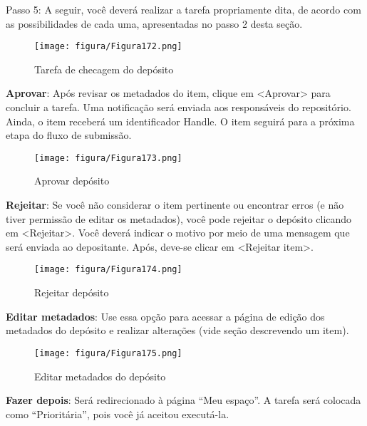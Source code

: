 \documentclass[12pt,hidelinks]{article}
\begin{document}
\newpage

    Passo 5: A seguir, você deverá realizar a tarefa propriamente dita, de acordo com as possibilidades de cada uma, apresentadas no passo 2 desta seção.
    
    \begin{figure}[!htp]
                \centering
                \texttt{[image: figura/Figura172.png]}
                \caption{Tarefa de checagem do depósito}
            \label{Rotulo}
        \end{figure}
    
    \textbf{Aprovar}: Após revisar os metadados do item, clique em <Aprovar> para concluir a tarefa. Uma notificação será enviada aos responsáveis do repositório. Ainda, o item receberá um identificador Handle. O item seguirá para a próxima etapa do fluxo de submissão.
    
    \begin{figure}[!htp]
                \centering
                \texttt{[image: figura/Figura173.png]}
                \caption{Aprovar depósito}
            \label{Rotulo}
        \end{figure}
    
    \textbf{Rejeitar}: Se você não considerar o item pertinente ou encontrar erros (e não tiver permissão de editar os metadados), você pode rejeitar o depósito clicando em <Rejeitar>. Você deverá indicar o motivo por meio de uma mensagem que será enviada ao depositante. Após, deve-se clicar em <Rejeitar item>.
    
    \begin{figure}[!htp]
                \centering
                \texttt{[image: figura/Figura174.png]}
                \caption{Rejeitar depósito}
            \label{Rotulo}
        \end{figure}
    
\newpage

    \textbf{Editar metadados}: Use essa opção para acessar a página de edição dos metadados do depósito e realizar alterações (vide seção descrevendo um item).
    
    \begin{figure}[!htp]
                \centering
                \texttt{[image: figura/Figura175.png]}
                \caption{Editar metadados do depósito}
            \label{Rotulo}
        \end{figure}
    
    \textbf{Fazer depois}: Será redirecionado à página “Meu espaço”. A tarefa será colocada como “Prioritária”, pois você já aceitou executá-la.
    
\end{document}
